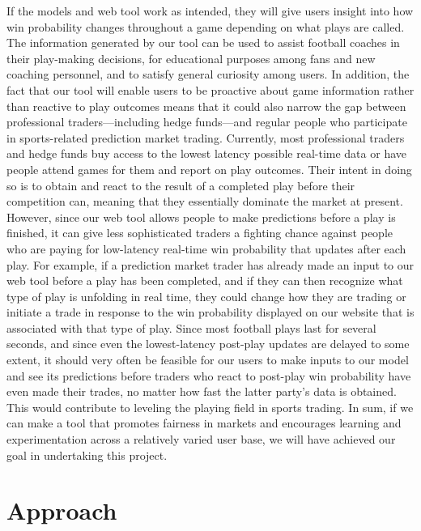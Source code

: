 \documentclass[conference]{IEEEtran}
\begin{document}
If the models and web tool work as intended, they will give users insight into
how win probability changes throughout a game depending on what plays are
called. The information generated by our tool can be used to assist football
coaches in their play-making decisions, for educational purposes among fans and
new coaching personnel, and to satisfy general curiosity among users. In
addition, the fact that our tool will enable users to be proactive about game
information rather than reactive to play outcomes means that it could also
narrow the gap between professional traders---including hedge funds---and
regular people who participate in sports-related prediction market trading.
Currently, most professional traders and hedge funds buy access to the lowest
latency possible real-time data or have people attend games for them and report
on play outcomes. Their intent in doing so is to obtain and react to the result
of a completed play before their competition can, meaning that they essentially
dominate the market at present. However, since our web tool allows people to
make predictions before a play is finished, it can give less sophisticated
traders a fighting chance against people who are paying for low-latency
real-time win probability that updates after each play. For example, if a
prediction market trader has already made an input to our web tool before a
play has been completed, and if they can then recognize what type of play is
unfolding in real time, they could change how they are trading or initiate a
trade in response to the win probability displayed on our website that is
associated with that type of play. Since most football plays last for several
seconds, and since even the lowest-latency post-play updates are delayed to
some extent, it should very often be feasible for our users to make inputs to
our model and see its predictions before traders who react to post-play win
probability have even made their trades, no matter how fast the latter party's
data is obtained. This would contribute to leveling the playing field in sports
trading. In sum, if we can make a tool that promotes fairness in markets and
encourages learning and experimentation across a relatively varied user base,
we will have achieved our goal in undertaking this project.

\section{Approach}
\end{document}
